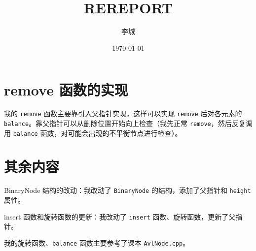 \documentclass{article}
\title{REREPORT}
\author{李城}
\date{\today}
\begin{document}
\maketitle

\section{remove 函数的实现}

我的 \texttt{remove} 函数主要靠引入父指针实现，这样可以实现 \texttt{remove} 后对各元素的 \texttt{balance}。靠父指针可以从删除位置开始向上检查（我先正常 \texttt{remove}，然后反复调用 \texttt{balance} 函数，对可能会出现的不平衡节点进行检查）。
\section{其余内容}
BinaryNode 结构的改动：我改动了 \texttt{BinaryNode} 的结构，添加了父指针和 \texttt{height} 属性。

insert 函数和旋转函数的更新：我改动了 \texttt{insert} 函数、旋转函数，更新了父指针。

我的旋转函数、\texttt{balance} 函数主要参考了课本 \texttt{AvlNode.cpp}。
\end{document}
